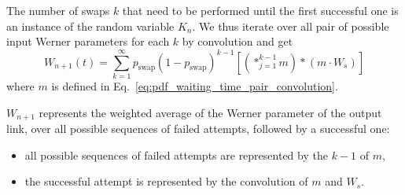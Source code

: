 \documentclass{masterthesis}
\begin{document}
The number of swaps $k$ that need to be performed until the first successful one is an instance of the random variable $K_{n}$.
We thus iterate over all pair of possible input Werner parameters for each $k$ by convolution and get
\begin{equation}\label{eq:werner_parameter_swap}
    W_{n+1}(t) = \sum_{k=1}^{\infty} p_\text{swap} {(1 - p_\text{swap})}^{k-1} \left[ \left( \ast_{j=1}^{k-1} m \right) \ast \left( m \cdot W_{s} \right) \right]
\end{equation}
where $m$ is defined in Eq.~\ref{eq:pdf_waiting_time_pair_convolution}.

$W_{n+1}$ represents the weighted average of the Werner parameter of the output link, over all possible sequences of failed attempts, followed by a successful one:
\begin{itemize}
    \item all possible sequences of failed attempts are represented by the $k-1$ of $m$,
    \item the successful attempt is represented by the convolution of $m$ and $W_{s}$.
\end{itemize}



        
    
\end{document}
